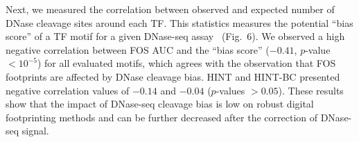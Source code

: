\documentclass[12pt]{article}
\begin{document}
Next, we measured the correlation between observed and expected number of DNase cleavage sites around each TF. This statistics measures the potential ``bias score'' of a TF motif for a given DNase-seq assay~\cite{he2014} (Fig.~6). We observed a high negative correlation between FOS AUC and the ``bias score'' ($−0.41$, $p$-value $< 10^{-5}$) for all evaluated motifs, which agrees with the observation that FOS footprints are affected by DNase cleavage bias. HINT and HINT-BC presented negative correlation values of $-0.14$ and $-0.04$ ($p$-values $> 0.05$). These results show that the impact of DNase-seq cleavage bias is low on robust digital footprinting methods and can be further decreased after the correction of DNase-seq signal.

\vspace{-0.3cm}

\renewcommand{\refname}{\normalfont\selectfont\scriptsize }
\setlength{\bibsep}{2pt}

{\scriptsize
}
\end{document}

